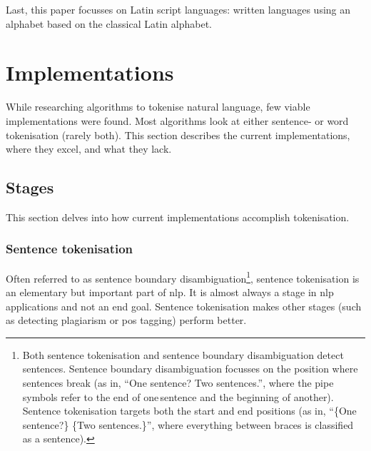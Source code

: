 Last, this paper focusses on Latin script languages: written languages
  using an alphabet based on the classical Latin alphabet.

\section{Implementations}\label{implementations}

While researching algorithms to tokenise natural language, few viable
  implementations were found.
Most algorithms look at either sentence- or word tokenisation (rarely both).
This section describes the current implementations, where they excel, and
  what they lack.

\subsection{Stages}\label{stages}

This section delves into how current implementations accomplish tokenisation.

\subsubsection{Sentence tokenisation}\label{sentence-tokenisation}

Often referred to as sentence boundary disambiguation\footnote{Both
    sentence tokenisation and sentence boundary disambiguation detect
      sentences.
    Sentence boundary disambiguation focusses on the position where
      sentences break (as in, ``One sentence?\textbar{} Two
      sentences.\textbar{}'', where the pipe symbols refer to the end of
      one\,sentence and the beginning of another).
    Sentence tokenisation targets both the start and end positions (as in,
      ``\{One sentence?\} \{Two sentences.\}'', where everything between
      braces is classified as a sentence).}, sentence
  tokenisation is an elementary but important part of \gls{nlp}.
It is almost always a stage in \gls{nlp} applications and not an end goal.
Sentence tokenisation makes other stages (such as detecting plagiarism or
  \gls{pos} tagging) perform better.

